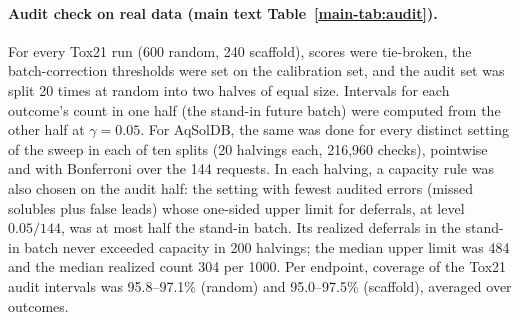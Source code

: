 \documentclass[10pt]{article}
\begin{document}
\paragraph{Audit check on real data (main text Table~\ref{main-tab:audit}).} For every Tox21 run (600 random, 240 scaffold), scores were tie-broken, the batch-correction thresholds were set on the calibration set, and the audit set was split 20 times at random into two halves of equal size. Intervals for each outcome's count in one half (the stand-in future batch) were computed from the other half at $\gamma=0.05$. For AqSolDB, the same was done for every distinct setting of the sweep in each of ten splits (20 halvings each, 216,960 checks), pointwise and with Bonferroni over the 144 requests. In each halving, a capacity rule was also chosen on the audit half: the setting with fewest audited errors (missed solubles plus false leads) whose one-sided upper limit for deferrals, at level $0.05/144$, was at most half the stand-in batch. Its realized deferrals in the stand-in batch never exceeded capacity in 200 halvings; the median upper limit was 484 and the median realized count 304 per 1000. Per endpoint, coverage of the Tox21 audit intervals was 95.8--97.1\% (random) and 95.0--97.5\% (scaffold), averaged over outcomes.


\end{document}
